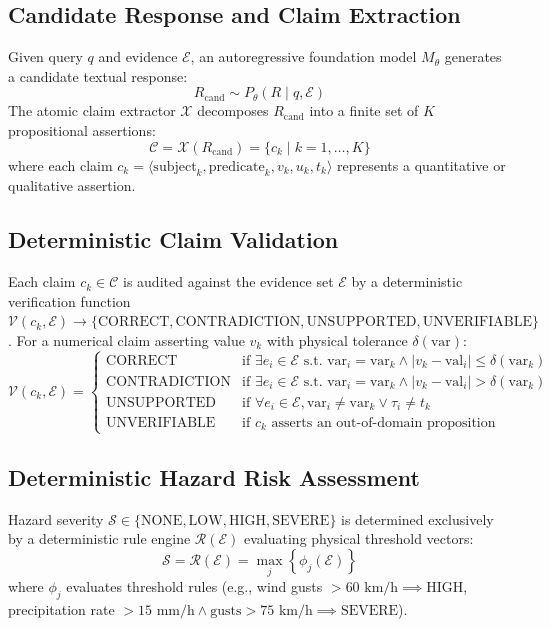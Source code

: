 \documentclass[conference]{IEEEtran}
\begin{document}
\subsection{Candidate Response and Claim Extraction}
Given query $q$ and evidence $\mathcal{E}$, an autoregressive foundation model $M_{\theta}$ generates a candidate textual response:
\begin{equation}
R_{\text{cand}} \sim P_{\theta}(R \mid q, \mathcal{E})
\end{equation}
The atomic claim extractor $\mathcal{X}$ decomposes $R_{\text{cand}}$ into a finite set of $K$ propositional assertions:
\begin{equation}
\mathcal{C} = \mathcal{X}(R_{\text{cand}}) = \{ c_k \mid k = 1, \dots, K \}
\end{equation}
where each claim $c_k = \langle \text{subject}_k, \text{predicate}_k, v_k, u_k, t_k \rangle$ represents a quantitative or qualitative assertion.

\subsection{Deterministic Claim Validation}
Each claim $c_k \in \mathcal{C}$ is audited against the evidence set $\mathcal{E}$ by a deterministic verification function $\mathcal{V}(c_k, \mathcal{E}) \to \{ \text{CORRECT}, \text{CONTRADICTION}, \text{UNSUPPORTED}, \text{UNVERIFIABLE} \}$.
For a numerical claim asserting value $v_k$ with physical tolerance $\delta(\text{var})$:
\begin{equation}
\mathcal{V}(c_k, \mathcal{E}) = \begin{cases} 
\text{CORRECT} & \text{if } \exists e_i \in \mathcal{E} \text{ s.t. } \text{var}_i = \text{var}_k \land |v_k - \text{val}_i| \le \delta(\text{var}_k) \\
\text{CONTRADICTION} & \text{if } \exists e_i \in \mathcal{E} \text{ s.t. } \text{var}_i = \text{var}_k \land |v_k - \text{val}_i| > \delta(\text{var}_k) \\
\text{UNSUPPORTED} & \text{if } \forall e_i \in \mathcal{E}, \text{var}_i \ne \text{var}_k \lor \tau_i \ne t_k \\
\text{UNVERIFIABLE} & \text{if } c_k \text{ asserts an out-of-domain proposition}
\end{cases}
\end{equation}

\subsection{Deterministic Hazard Risk Assessment}
Hazard severity $\mathcal{S} \in \{ \text{NONE}, \text{LOW}, \text{HIGH}, \text{SEVERE} \}$ is determined exclusively by a deterministic rule engine $\mathcal{R}(\mathcal{E})$ evaluating physical threshold vectors:
\begin{equation}
\mathcal{S} = \mathcal{R}(\mathcal{E}) = \max_{j} \left\{ \phi_j(\mathcal{E}) \right\}
\end{equation}
where $\phi_j$ evaluates threshold rules (e.g., wind gusts $>60\text{ km/h} \implies \text{HIGH}$, precipitation rate $>15\text{ mm/h} \land \text{gusts} >75\text{ km/h} \implies \text{SEVERE}$).
\end{document}
